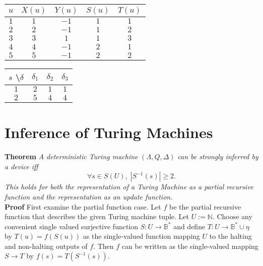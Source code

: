 \documentclass[11pt]{article}
\newcommand{\N}{\mathbb{N}}
\newcommand{\B}{\mathbb{B}}
\begin{document}
 \begin{center}
 \begin{tabular}{ |c||c|c|c|c| } 

 \hline
 $ u $ & $ X(u) $ & $ Y(u) $ & $ S(u) $ & $ T(u) $ \\ 
 \hline
 \hline
 $ 1 $ & $ 1 $ & $ -1 $ & $ 1 $ & $ 1 $ \\
 \hline
 $ 2 $ & $ 2 $ & $ -1 $ & $ 1 $ & $ 2 $ \\
 \hline
 $ 3 $ & $ 3 $ & $ 1 $ & $ 1 $ & $ 3 $ \\
 \hline
 $ 4 $ & $ 4 $ & $ -1 $ & $ 2 $ & $ 1 $ \\
 \hline
 $ 5 $ & $ 5 $ & $ -1 $ & $ 2 $ & $ 2 $ \\
 \hline
 \end{tabular} 
 \quad
 \begin{tabular}{ |c||c|c|c| } 

 \hline
 $ s $ \textbackslash $ \delta $ & $ \delta_1 $ & $ \delta_2 $ & $ \delta_3 $ \\ 
 \hline
 \hline
 $ 1 $ & $ 2 $ & $ 1 $ & $ 1 $  \\
  \hline
 $ 2 $ & $ 5 $ & $ 4 $ & $ 4 $  \\
 \hline
 
 \end{tabular}
 \end{center} 

\bigskip 
\bigskip
\section{Inference of Turing Machines}
\textbf{Theorem} \quad \textit{A deterministic Turing machine} $(\Lambda, Q, \Delta)$ \textit{can be strongly inferred by a device iff} 
$$\forall s \in S(U),\; |S^{-1}(s)| \geq 2. $$ \textit{This holds for both the representation of a Turing Machine as a partial recursive function and the representation as an update function.} \\

\textbf{Proof} \quad First examine the partial function case. Let $ f $ be the partial recursive function that describes the given Turing machine tuple. Let $ U := \N $. Choose any convenient single valued surjective function $ S: U \rightarrow \B^{*} $ and define $ T: U \rightarrow \B^{*} \cup \eta$ by $T(u) = f(S(u)) $ as the single-valued function mapping $ U $ to the halting and non-halting outputs of $ f $. Then $ f $ can be written as the single-valued mapping $ S \rightarrow T $ by $ f(s) = T(S^{-1}(s)) $. \\
\end{document}
